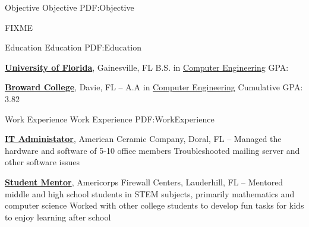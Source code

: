 \documentclass[a4paper,MMMyyyy,nonstopmode]{resume}
\newcommand{\CVAuthor}{Joseph Cortez}
\newcommand{\CVWebpage}{http://www.josephcortez.me/}
\begin{document}

\Title{\CVAuthor}


\begin{Body}


\Section
{Objective}
{Objective}
{PDF:Objective}

\Entry
FIXME


\Section
{Education}
{Education}
{PDF:Education}

\Entry
\href{http://www.ufl.edu}
{\textbf{University of Florida}},
Gainesville, FL
\hfill
{}
\Gap
\BulletItem
B.S. in
\href{http://www.cpe.eng.ufl.edu}
{Computer Engineering}
\BulletItem
GPA:

\BigGap
\Entry
\href{http://www.broward.edu}
{\textbf{Broward College}},
Davie, FL
\hfill
{} --
\Gap
\BulletItem
A.A in
\href{http://www.broward.edu/academics/programs/computer/capture/Pages/what-is-computer-science-and-engineering-.aspx}
{Computer Engineering}
\BulletItem
Cumulative GPA: 3.82


\Section
{Work\newline
Experience}
{Work Experience}
{PDF:WorkExperience}

\Entry
\href{http://www.example.com/my-company}
{\textbf{IT Administator}}, 
American Ceramic Company,
Doral, FL
\hfill
{} --
\Gap
\BulletItem
Managed the hardware and software of 5-10 office members
\BulletItem
Troubleshooted mailing server and other software issues

\BigGap
\Entry
\href{http://www.example.com/my-company}
{\textbf{Student Mentor}},
Americorps Firewall Centers,
Lauderhill, FL
\hfill
{} --
\Gap
\BulletItem
Mentored middle and high school students in STEM subjects, primarily mathematics and computer science
\BulletItem
Worked with other college students to develop fun tasks for kids to enjoy learning after school


\end{Body}
\end{document}
